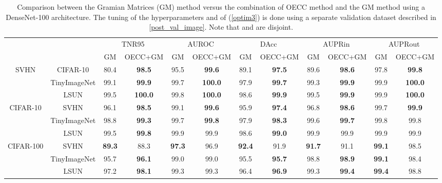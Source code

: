 \documentclass{article} \usepackage{iclr2020_conference,times}
\begin{document}
\begin{table*}[h]
\begin{adjustbox}{max width=\textwidth}
\begin{tabular}{cc|cc|cc|cc|cc|cc}
\multicolumn{2}{c}{}&\multicolumn{2}{c}{TNR95}&\multicolumn{2}{c}{AUROC}&\multicolumn{2}{c}{DAcc}&\multicolumn{2}{c}{AUPRin}&\multicolumn{2}{c}{AUPRout}\\
\cline{3-12} 
&&GM&OECC+GM&GM&OECC+GM&GM&OECC+GM&GM&OECC+GM&GM&OECC+GM\\
\hline
\multirow{3}{*}{{{SVHN}}}&CIFAR-10&80.4&\textbf{98.5}&95.5&\textbf{99.6}&89.1&\textbf{97.5}&89.6&\textbf{98.6}&97.8&\textbf{99.8}\\
&TinyImageNet&99.1&\textbf{99.9}&99.7&\textbf{100.0}&97.9&\textbf{99.7}&99.3&\textbf{99.9}&99.9&\textbf{100.0}\\
&LSUN&99.5&\textbf{100.0}&99.8&\textbf{100.0}&98.6&\textbf{99.9}&99.5&\textbf{99.9}&99.9&\textbf{100.0}\\
\hline
\multirow{3}{*}{{{CIFAR-10}}}&SVHN&96.1&\textbf{98.5}&99.1&\textbf{99.6}&95.9&\textbf{97.4}&96.8&\textbf{98.6}&99.7&\textbf{99.9}\\
&TinyImageNet&98.8&\textbf{99.3}&99.7&\textbf{99.8}&97.9&\textbf{98.3}&99.6&\textbf{99.7}&99.8&99.8\\
&LSUN&99.5&\textbf{99.8}&99.9&99.9&98.6&\textbf{99.0}&99.9&99.9&99.9&99.9\\
\hline
\multirow{3}{*}{{{CIFAR-100}}}&SVHN&\textbf{89.3}&88.3&\textbf{97.3}&96.9&\textbf{92.4}&91.9&\textbf{91.7}&91.1&\textbf{99.1}&98.5\\
&TinyImageNet&95.7&\textbf{96.1}&99.0&99.0&95.5&\textbf{95.7}&98.8&\textbf{98.9}&\textbf{99.1}&98.4\\
&LSUN&97.2&\textbf{98.1}&99.3&99.3&96.4&\textbf{96.9}&99.3&\textbf{99.4}&\textbf{99.4}&98.8\\
\hline
\end{tabular}
\end{adjustbox}
\caption{\label{FCorr_Densenet}Comparison between the Gramian Matrices (GM) method \citep{ch2019detecting} versus the combination of OECC method and the GM method using a DenseNet-100 architecture. The tuning of the hyperparameters  and  of (\ref{optim3}) is done using a separate validation dataset  described in \ref{post_val_image}. Note that  and  are disjoint.}
\end{table*}
\end{document}
